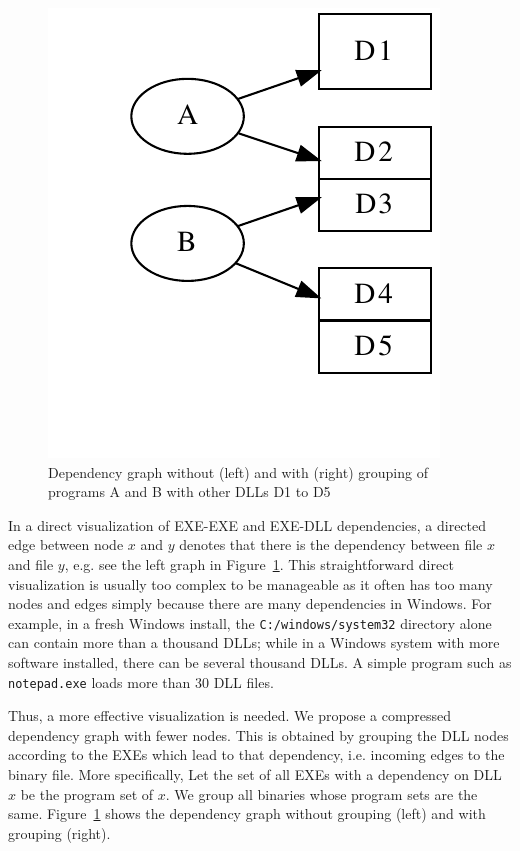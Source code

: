 \begin{figure}
\includegraphics[scale=0.4]{depvis/example-group.pdf}
\caption{Dependency graph without (left) and with (right) grouping of programs
A and B with other DLLs D1 to D5}
\label{fig:grouping}
\end{figure}

In a direct visualization of EXE-EXE and EXE-DLL dependencies,
a directed edge between node $x$ and $y$ denotes that there is
the dependency between file $x$ and file $y$,
e.g. see the left graph in Figure~\ref{fig:grouping}.
This straightforward direct visualization is usually too complex
to be manageable as it often has too many nodes and edges simply
because there are many dependencies in Windows.
For example, in a fresh Windows install,
the {\tt C:/windows/system32} directory alone can contain more
than a thousand DLLs; while in a Windows system with more software installed,
there can be several thousand DLLs.
A simple program such as {\tt notepad.exe} loads more than 30 DLL files.

Thus, a more effective visualization is needed.
We propose a compressed dependency graph with fewer nodes.
This is obtained by grouping the DLL nodes according to the
EXEs which lead to that dependency,
i.e. incoming edges to the binary file.
More specifically, Let the set of all EXEs with a dependency on DLL $x$
be the program set of $x$.
We group all binaries whose program sets are the same.
Figure~\ref{fig:grouping} shows the dependency graph without grouping (left) and
with grouping (right).

